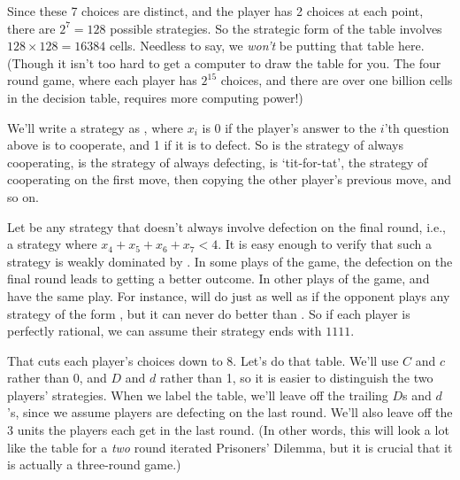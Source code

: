 \noindent Since these 7 choices are distinct, and the player has 2 choices at each point, there are $2^7 = 128$ possible strategies. So the strategic form of the table involves $128 \times 128 = 16384$ cells. Needless to say, we \textit{won't} be putting that table here. (Though it isn't too hard to get a computer to draw the table for you. The four round game, where each player has $2^{15}$ choices, and there are over one billion cells in the decision table, requires more computing power!)

We'll write a strategy as , where $x_i$ is 0 if the player's answer to the $i$'th question above is to cooperate, and 1 if it is to defect. So  is the strategy of always cooperating,  is the strategy of always defecting,  is `tit-for-tat', the strategy of cooperating on the first move, then copying the other player's previous move, and so on.

Let  be any strategy that doesn't always involve defection on the final round, i.e., a strategy where $x_4 + x_5 + x_6 + x_7 < 4$. It is easy enough to verify that such a strategy is weakly dominated by . In some plays of the game, the defection on the final round leads to getting a better outcome. In other plays of the game,  and  have the same play. For instance,  will do just as well as  if the opponent plays any strategy of the form , but it can never do better than . So if each player is perfectly rational, we can assume their strategy ends with $1111$.

That cuts each player's choices down to 8. Let's do that table. We'll use $C$ and $c$ rather than 0, and $D$ and $d$ rather than 1, so it is easier to distinguish the two players' strategies. When we label the table, we'll leave off the trailing $D$s and $d$'s, since we assume players are defecting on the last round. We'll also leave off the 3 units the players each get in the last round. (In other words, this will look a lot like the table for a \textit{two} round iterated Prisoners' Dilemma, but it is crucial that it is actually a three-round game.)

